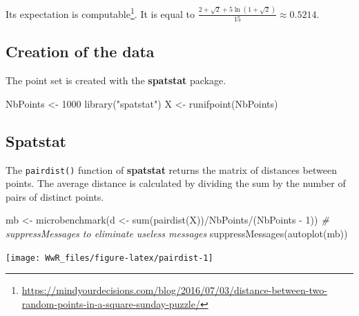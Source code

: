 \documentclass[
  12pt,
  american,
  a4paper,
  extrafontsizes,onecolumn,openright
  ]{memoir}
\newenvironment{Shaded}{\begin{snugshade}}{\end{snugshade}}
\newcommand{\CommentTok}[1]{\textcolor[rgb]{0.56,0.35,0.01}{\textit{#1}}}
\newcommand{\DecValTok}[1]{\textcolor[rgb]{0.00,0.00,0.81}{#1}}
\newcommand{\FunctionTok}[1]{\textcolor[rgb]{0.00,0.00,0.00}{#1}}
\newcommand{\NormalTok}[1]{#1}
\newcommand{\OtherTok}[1]{\textcolor[rgb]{0.56,0.35,0.01}{#1}}
\newcommand{\SpecialCharTok}[1]{\textcolor[rgb]{0.00,0.00,0.00}{#1}}
\newcommand{\StringTok}[1]{\textcolor[rgb]{0.31,0.60,0.02}{#1}}
\begin{document}
Its expectation is computable\footnote{\url{https://mindyourdecisions.com/blog/2016/07/03/distance-between-two-random-points-in-a-square-sunday-puzzle/}}.
It is equal to \(\frac{2+\sqrt{2}+5\ln{(1+\sqrt{2})}}{15} \approx 0.5214\).

\hypertarget{creation-of-the-data}{%
\subsection{Creation of the data}\label{creation-of-the-data}}

The point set is created with the \textbf{spatstat} package.

\scriptsize

\begin{Shaded}
\begin{Highlighting}[]
\NormalTok{NbPoints }\OtherTok{\textless{}{-}} \DecValTok{1000}
\FunctionTok{library}\NormalTok{(}\StringTok{"spatstat"}\NormalTok{)}
\NormalTok{X }\OtherTok{\textless{}{-}} \FunctionTok{runifpoint}\NormalTok{(NbPoints)}
\end{Highlighting}
\end{Shaded}

\normalsize

\hypertarget{spatstat}{%
\subsection{Spatstat}\label{spatstat}}

The \texttt{pairdist()} function of \textbf{spatstat} returns the matrix of distances between points.
The average distance is calculated by dividing the sum by the number of pairs of distinct points.

\scriptsize

\begin{Shaded}
\begin{Highlighting}[]
\NormalTok{mb }\OtherTok{\textless{}{-}} \FunctionTok{microbenchmark}\NormalTok{(d }\OtherTok{\textless{}{-}} \FunctionTok{sum}\NormalTok{(}\FunctionTok{pairdist}\NormalTok{(X))}\SpecialCharTok{/}\NormalTok{NbPoints}\SpecialCharTok{/}\NormalTok{(NbPoints }\SpecialCharTok{{-}}
    \DecValTok{1}\NormalTok{))}
\CommentTok{\# suppressMessages to eliminate useless messages}
\FunctionTok{suppressMessages}\NormalTok{(}\FunctionTok{autoplot}\NormalTok{(mb))}
\end{Highlighting}
\end{Shaded}

\begin{center}\texttt{[image: WwR\_files/figure-latex/pairdist-1]} \end{center}
\end{document}

